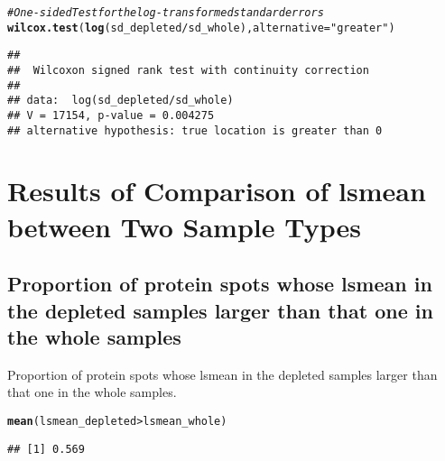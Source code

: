 \documentclass{article}\usepackage[]{graphicx}\usepackage[]{color}
\makeatletter
\newcommand{\hlstr}[1]{\textcolor[rgb]{0.192,0.494,0.8}{#1}}%
\newcommand{\hlcom}[1]{\textcolor[rgb]{0.678,0.584,0.686}{\textit{#1}}}%
\newcommand{\hlopt}[1]{\textcolor[rgb]{0,0,0}{#1}}%
\newcommand{\hlstd}[1]{\textcolor[rgb]{0.345,0.345,0.345}{#1}}%
\newcommand{\hlkwc}[1]{\textcolor[rgb]{0.333,0.667,0.333}{#1}}%
\newcommand{\hlkwd}[1]{\textcolor[rgb]{0.737,0.353,0.396}{\textbf{#1}}}%
\newenvironment{kframe}{%
 \def\at@end@of@kframe{}%
 \ifinner\ifhmode%
  \def\at@end@of@kframe{\end{minipage}}%
  \begin{minipage}{\columnwidth}%
 \fi\fi%
 \def\FrameCommand##1{\hskip\@totalleftmargin \hskip-\fboxsep
 \colorbox{shadecolor}{##1}\hskip-\fboxsep
     \hskip-\linewidth \hskip-\@totalleftmargin \hskip\columnwidth}%
 \MakeFramed {\advance\hsize-\width
   \@totalleftmargin\z@ \linewidth\hsize
   \@setminipage}}%
 {\par\unskip\endMakeFramed%
 \at@end@of@kframe}
\newenvironment{knitrout}{}{} %
\makeatother
\begin{document}
\begin{knitrout}
\color{fgcolor}\begin{kframe}
\begin{alltt}
\hlcom{# One-sided Test for the log-transformed standard errors}
\hlkwd{wilcox.test}\hlstd{(}\hlkwd{log}\hlstd{(sd_depleted}\hlopt{/}\hlstd{sd_whole),} \hlkwc{alternative} \hlstd{=} \hlstr{"greater"}\hlstd{)}
\end{alltt}
\begin{verbatim}
## 
## 	Wilcoxon signed rank test with continuity correction
## 
## data:  log(sd_depleted/sd_whole)
## V = 17154, p-value = 0.004275
## alternative hypothesis: true location is greater than 0
\end{verbatim}
\end{kframe}
\end{knitrout}

% 
% 
% 



\section{Results of Comparison of lsmean between Two Sample Types}
\subsection{Proportion of protein spots whose lsmean in the depleted samples larger than that one  in the whole samples}
Proportion of protein spots whose lsmean in the depleted samples larger than that one  in the whole samples.
\begin{knitrout}
\color{fgcolor}\begin{kframe}
\begin{alltt}
\hlkwd{mean}\hlstd{(lsmean_depleted} \hlopt{>} \hlstd{lsmean_whole)}
\end{alltt}
\begin{verbatim}
## [1] 0.569
\end{verbatim}
\end{kframe}
\end{knitrout}
\end{document}
